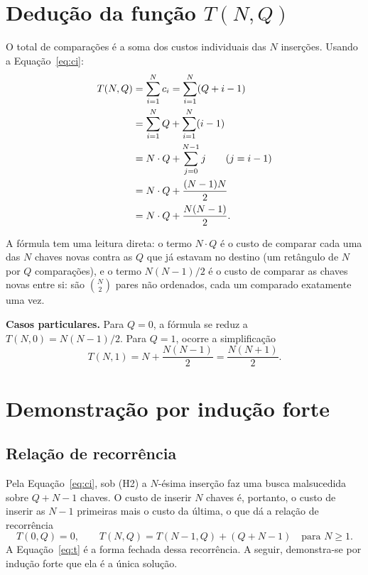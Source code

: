 \documentclass[11pt,a4paper]{article}
\begin{document}
\section{Dedução da função $T(N,Q)$}
\label{sec:deducao}

O total de comparações é a soma dos custos individuais das $N$ inserções. Usando a Equação~\eqref{eq:ci}:
\begin{align}
T(N,Q)&=\sum_{i=1}^{N}c_i=\sum_{i=1}^{N}(Q+i-1)\notag\\
&=\sum_{i=1}^{N}Q+\sum_{i=1}^{N}(i-1)\notag\\
&=N\cdot Q+\sum_{j=0}^{N-1}j\qquad(j=i-1)\notag\\
&=N\cdot Q+\frac{(N-1)N}{2}\notag\\
&=N\cdot Q+\frac{N(N-1)}{2}.\label{eq:deducao}
\end{align}

A fórmula tem uma leitura direta: o termo $N\cdot Q$ é o custo de comparar cada uma das $N$ chaves novas contra as $Q$ que já estavam no destino (um retângulo de $N$ por $Q$ comparações), e o termo $N(N-1)/2$ é o custo de comparar as chaves novas entre si: são $\binom N2$ pares não ordenados, cada um comparado exatamente uma vez.

\textbf{Casos particulares.} Para $Q=0$, a fórmula se reduz a $T(N,0)=N(N-1)/2$. Para $Q=1$, ocorre a simplificação
\begin{equation}
T(N,1)=N+\frac{N(N-1)}{2}=\frac{N(N+1)}{2}.
\label{eq:q1}
\end{equation}

\section{Demonstração por indução forte}
\label{sec:inducao}

\subsection{Relação de recorrência}

Pela Equação~\eqref{eq:ci}, sob (H2) a $N$-ésima inserção faz uma busca malsucedida sobre $Q+N-1$ chaves. O custo de inserir $N$ chaves é, portanto, o custo de inserir as $N-1$ primeiras mais o custo da última, o que dá a relação de recorrência
\begin{equation}
T(0,Q)=0,\qquad T(N,Q)=T(N-1,Q)+(Q+N-1)\quad\text{para }N\ge1.
\label{eq:rec1}
\end{equation}
A Equação~\eqref{eq:t} é a forma fechada dessa recorrência. A seguir, demonstra-se por indução forte que ela é a única solução.
\end{document}
